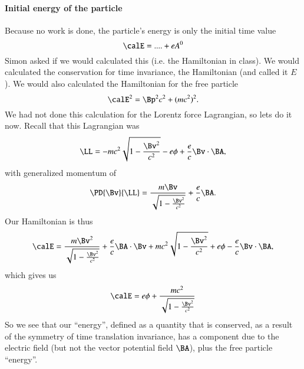 {\paragraph{Initial energy of the particle}
%
Because no work is done, the particle's energy is only the initial time value
%
\begin{equation}\label{eqn:relativisticElectrodynamicsT3:520}
\calE = .... + e A^0
\end{equation}
%
Simon asked if we would calculated this (i.e. the Hamiltonian in class).  We would calculated the conservation for time invariance, the Hamiltonian (and called it \(E\)).  We would also calculated the Hamiltonian for the free particle
%
\begin{equation}\label{eqn:relativisticElectrodynamicsT3:530}
\calE^2 = \Bp^2 c^2 + (m c^2)^2.
\end{equation}
%
We had not done this calculation for the Lorentz force Lagrangian, so lets do it now.  Recall that this Lagrangian was
%
\begin{equation}\label{eqn:relativisticElectrodynamicsT3:531}
\LL =
- m c^2 \sqrt{1 - \frac{\Bv^2}{c^2}} - e \phi + \frac{e}{c} \Bv \cdot \BA,
\end{equation}
with generalized momentum of
\begin{equation}\label{eqn:relativisticElectrodynamicsT3:532}
\PD{\Bv}{\LL} = \frac{m \Bv}{\sqrt{1 - \frac{\Bv^2}{c^2}}} + \frac{e}{c} \BA.
\end{equation}
%
Our Hamiltonian is thus
%
\begin{equation}\label{eqn:relativisticElectrodynamicsT3:1050}
\begin{aligned}
\calE
=
\frac{m \Bv^2}{\sqrt{1 - \frac{\Bv^2}{c^2}}} + \frac{e}{c} \BA \cdot \Bv
+ m c^2 \sqrt{1 - \frac{\Bv^2}{c^2}} + e \phi - \frac{e}{c} \Bv \cdot \BA,
\end{aligned}
\end{equation}
%
which gives us
%
\begin{equation}\label{eqn:relativisticElectrodynamicsT3:1070}
\begin{aligned}
\calE = e \phi + \frac{m c^2}{\sqrt{1 - \frac{\Bv^2}{c^2}}}
\end{aligned}
\end{equation}
%
So we see that our ``energy'', defined as a quantity that is conserved, as a result of the symmetry of time translation invariance, has a component due to the electric field (but not the vector potential field \(\BA\)), plus the free particle ``energy''.

}

